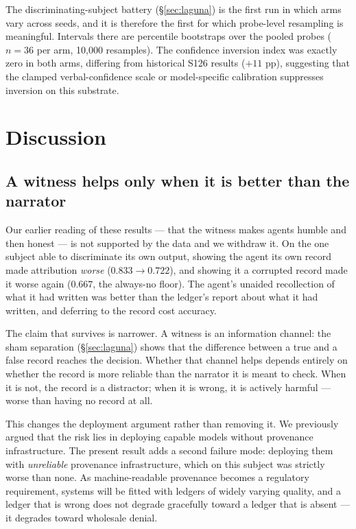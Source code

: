 \documentclass[11pt]{article}
\begin{document}
The discriminating-subject battery (\S\ref{sec:laguna}) is the first run in
which arms vary across seeds, and it is therefore the first for which
probe-level resampling is meaningful. Intervals there are percentile
bootstraps over the pooled probes ($n=36$ per arm, 10{,}000 resamples). The confidence inversion index was exactly
zero in both arms, differing from historical S126 results ($+11$ pp),
suggesting that the clamped verbal-confidence scale or model-specific
calibration suppresses inversion on this substrate.

\section{Discussion}\label{sec:discussion}

\subsection{A witness helps only when it is better than the narrator}

Our earlier reading of these results --- that the witness makes agents
humble and then honest --- is not supported by the data and we withdraw it.
On the one subject able to discriminate its own output, showing the agent
its own record made attribution \emph{worse} ($0.833 \to 0.722$), and
showing it a corrupted record made it worse again ($0.667$, the always-no
floor). The agent's unaided recollection of what it had written was better
than the ledger's report about what it had written, and deferring to the
record cost accuracy.

The claim that survives is narrower. A witness is an information channel:
the sham separation (\S\ref{sec:laguna}) shows that the difference between
a true and a false record reaches the decision. Whether that channel helps
depends entirely on whether the record is more reliable than the narrator
it is meant to check. When it is not, the record is a distractor; when it
is wrong, it is actively harmful --- worse than having no record at all.

This changes the deployment argument rather than removing it. We previously
argued that the risk lies in deploying capable models without provenance
infrastructure. The present result adds a second failure mode: deploying
them with \emph{unreliable} provenance infrastructure, which on this
subject was strictly worse than none. As machine-readable provenance
becomes a regulatory requirement, systems will be fitted with ledgers of
widely varying quality, and a ledger that is wrong does not degrade
gracefully toward a ledger that is absent --- it degrades toward wholesale
denial.
\end{document}
